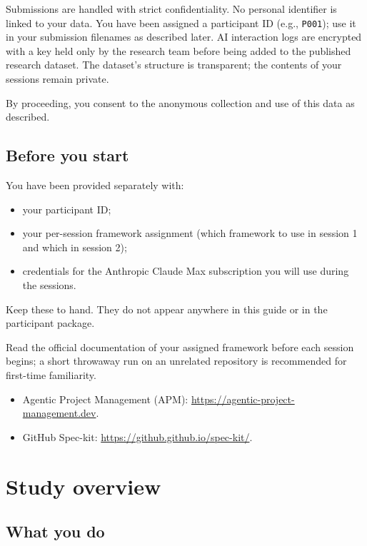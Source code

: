 \documentclass[11pt, a4paper]{article}
\begin{document}
Submissions are handled with strict confidentiality. No personal identifier is linked to your data. You have been assigned a participant ID (e.g., \texttt{P001}); use it in your submission filenames as described later. AI interaction logs are encrypted with a key held only by the research team before being added to the published research dataset. The dataset's structure is transparent; the contents of your sessions remain private.

By proceeding, you consent to the anonymous collection and use of this data as described.

\subsection{Before you start}
\label{sec:beforestart}

You have been provided separately with:

\begin{itemize}
    \item your participant ID;
    \item your per-session framework assignment (which framework to use in session 1 and which in session 2);
    \item credentials for the Anthropic Claude Max subscription you will use during the sessions.
\end{itemize}

Keep these to hand. They do not appear anywhere in this guide or in the participant package.

Read the official documentation of your assigned framework before each session begins; a short throwaway run on an unrelated repository is recommended for first-time familiarity.

\begin{itemize}
    \item Agentic Project Management (APM): \url{https://agentic-project-management.dev}.
    \item GitHub Spec-kit: \url{https://github.github.io/spec-kit/}.
\end{itemize}

\section{Study overview}
\label{sec:overview}

\subsection{What you do}
\label{sec:whatyoudo}
\end{document}
